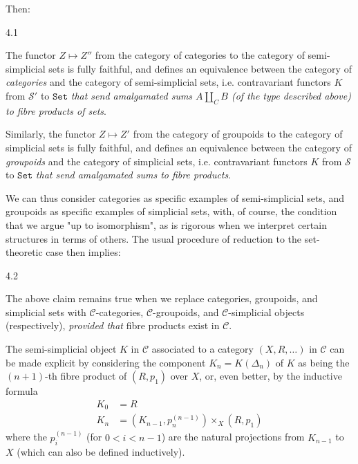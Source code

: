   Then:\begin{proposition}{4.1}\label{fga3.iii-4-proposition-4.1}\skipsinglepar\par{}The functor \(Z\mapsto  Z''\) from the category of categories to the category of semi-simplicial sets is fully faithful, and defines an equivalence between the category of \emph{categories} and the category of semi-simplicial sets, i.e. contravariant functors \(K\) from \(\mathcal {S}'\) to \(\mathtt {Set}\) \emph{that send amalgamated sums \(A\coprod _C B\) (of the type described above) to fibre products of sets}.\par{}Similarly, the functor \(Z\mapsto  Z'\) from the category of groupoids to the category of simplicial sets is fully faithful, and defines an equivalence between the category of \emph{groupoids} and the category of simplicial sets, i.e. contravariant functors \(K\) from \(\mathcal {S}\) to \(\mathtt {Set}\) \emph{that send amalgamated sums to fibre products}.\end{proposition}\par{}We can thus consider categories as specific examples of semi-simplicial sets, and groupoids as specific examples of simplicial sets, with, of course, the condition that we argue "up to isomorphism", as is rigorous when we interpret certain structures in terms of others.
  The usual procedure of reduction to the set-theoretic case then implies:\begin{corollary}{4.2}\label{fga3.iii-4-corollary-4.2}\skipsinglepar\par{}The above claim remains true when we replace categories, groupoids, and simplicial sets with \(\mathcal {C}\)-categories, \(\mathcal {C}\)-groupoids, and \(\mathcal {C}\)-simplicial objects (respectively), \emph{provided that} fibre products exist in \(\mathcal {C}\).\end{corollary}\par{}The semi-simplicial object \(K\) in \(\mathcal {C}\) associated to a category \((X,R,\ldots )\) in \(\mathcal {C}\) can be made explicit by considering the component \(K_n=K(\Delta _n)\) of \(K\) as being the \((n+1)\)-th fibre product of \((R,p_1)\) over \(X\), or, even better, by the inductive formula
  \[     \begin {aligned}       K_0 &= R     \\K_n &= (K_{n-1},p_n^{(n-1)})\times _X(R,p_1)     \end {aligned}   \]
  where the \(p_i^{(n-1)}\) (for \(0<i<n-1\)) are the natural projections from \(K_{n-1}\) to \(X\) (which can also be defined inductively).
